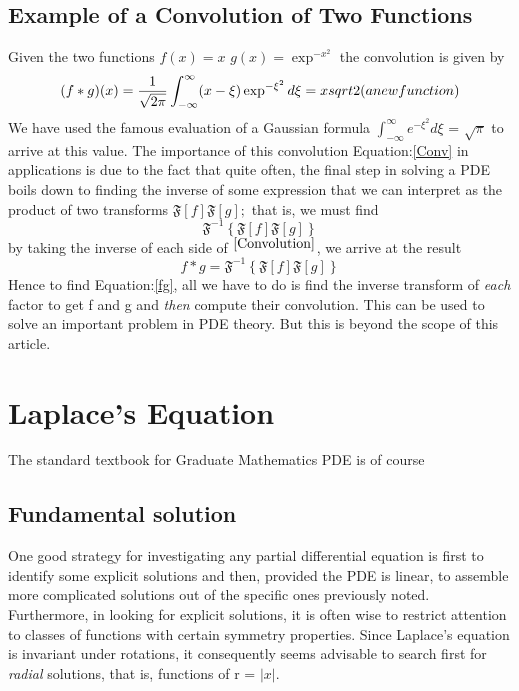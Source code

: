 \documentclass[a4paper,10pt]{article}
\numberwithin{equation}{section}
\numberwithin{figure}{section}
\theoremstyle{plain}
\begin{document}
\subsection{Example of a Convolution of Two Functions}
Given the two functions 
$f(x) = x$
$g(x) = \exp^{-x^{2}}$
the convolution is given by
\begin{displaymath}
 (f * g)(x) = \frac{1}{\sqrt{2\pi}} \int_{-\infty}^{\infty} (x - \xi)\exp^{-\xi^{2}}d\xi
\\ = x\\sqrt{2} (a new function)
\end{displaymath}
We have used the famous evaluation of a Gaussian formula
$\int_{-\infty}^{\infty} e^{-\xi^{2}} d\xi$ = $\sqrt{\pi}$
to arrive at this value. 
   The importance of this convolution Equation:\ref{Conv} in applications is due to the fact that quite often,
the final step in solving a PDE boils down to finding the inverse of some expression that we can 
interpret as the product of two transforms $\mathfrak{F}[f]\mathfrak{F}[g];$ that is, we must find 
\begin{equation}\label{fg}
 \mathfrak{F^{-1}} \left\lbrace \mathfrak{F}[f]\mathfrak{F}[g] \right\rbrace
\end{equation}
by taking the inverse of each side of $^{\ref{Convolution}}$, we arrive at the result
\begin{equation}
 f * g = \mathfrak{F^{-1}}\left\lbrace\mathfrak{F}[f]\mathfrak{F}[g]\right\rbrace
\end{equation}
Hence to find Equation:\ref{fg}, all we have to do is find the inverse transform of \textit{each} factor to get f and g
and \textit{then} compute their convolution.
This can be used to solve an important problem in PDE theory. But this is beyond the scope of this article.
\section{Laplace's Equation}
The standard textbook for Graduate Mathematics PDE is of course ~\cite{Evans_PDE}
\subsection{Fundamental solution}
One good strategy for investigating any partial differential equation is first to identify some explicit
solutions and then, provided the PDE is linear, to assemble more complicated solutions out of the specific
ones previously noted. Furthermore, in looking for explicit solutions, it is often wise to restrict
attention to classes of functions with certain symmetry properties. Since Laplace's equation is invariant
under rotations, it consequently seems advisable to search first for \textit{radial} solutions, that
is, functions of r = $|x|$.
\end{document}
